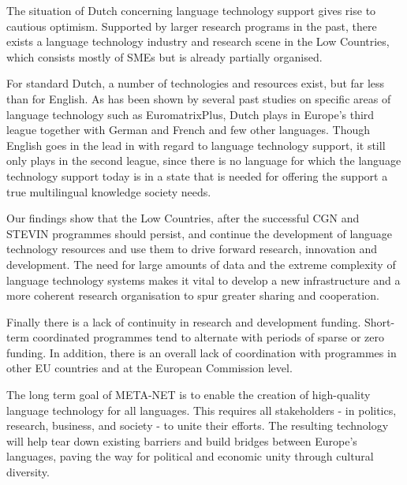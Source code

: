 \begin{multicols}{2}
   The situation of Dutch concerning language technology support gives rise to cautious optimism. Supported by larger research programs in the past, there exists a language technology industry and research scene in the Low Countries, which consists mostly of SMEs but is already partially organised.

    For standard Dutch, a number of technologies and resources exist, but far less than for English. As has been shown by several past studies on specific areas of language technology such as EuromatrixPlus, Dutch plays in Europe's third league together with German and French and few other languages. Though English goes in the lead in with regard to language technology support, it still only plays in the second league, since there is no language for which the language technology support today is in a state that is needed for offering the support a true multilingual knowledge society needs.

    Our findings show that the Low Countries, after the successful CGN and STEVIN programmes should persist, and continue the development of language technology resources and use them to drive forward research, innovation and development. The need for large amounts of data and the extreme complexity of language technology systems makes it vital to develop a new infrastructure and a more coherent research organisation to spur greater sharing and cooperation.


Finally there is a lack of continuity in research and development funding. Short-term coordinated programmes tend to alternate with periods of sparse or zero funding. In addition, there is an overall lack of coordination with programmes in other EU countries and at the European Commission level.

The long term goal of META-NET is to enable the creation of high-quality language technology for all languages. This requires all stakeholders - in politics, research, business, and society - to unite their efforts. The resulting technology will help tear down existing barriers and build bridges between Europe’s languages, paving the way for political and economic unity through cultural diversity.
\end{multicols}

\clearpage

